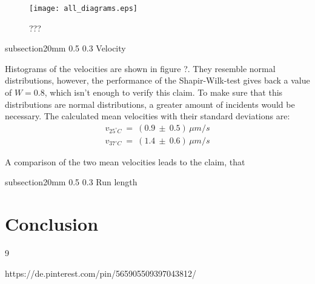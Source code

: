 \documentclass[english, %
parskip=full, %
bibliography=totoc, %
draft, %
]{scrartcl}
\makeatletter
\renewcommand\subsection{\@startsection 
   {subsection}{2}{0mm}%
   {0.5\baselineskip}%
   {0.3\baselineskip}%
   {\bfseries\sffamily\large}%
   }
\makeatother
\begin{document}
\begin{figure}[p] 
  \centering
     \texttt{[image: all\_diagrams.eps]}
  \caption{???}
\end{figure}

\subsection{Velocity}

Histograms of the velocities are shown in figure ?. They resemble normal distributions, however, the performance of the Shapir-Wilk-test gives back a value of $W = 0.8$, which isn't enough to verify this claim. To make sure that this distributions are normal distributions, a greater amount of incidents would be necessary.  The calculated mean velocities with their standard deviations are:
\begin{align*}
v _{25^\circ C} \ = \ (0.9 \ \pm \ 0.5) \, \mu m/s \\
v _{37^\circ C} \ = \ (1.4 \ \pm \ 0.6) \, \mu m/s
\end{align*}

A comparison of the two mean velocities leads to the claim, that 

\subsection{Run length}

\section{Conclusion}


\begin{thebibliography}{9}

  https://de.pinterest.com/pin/565905509397043812/

\end{thebibliography}
\end{document}
